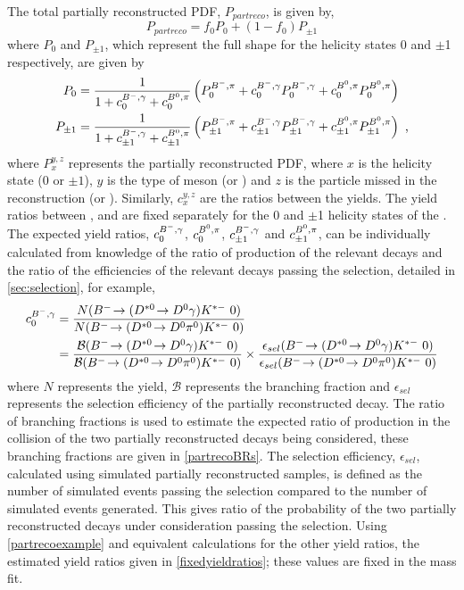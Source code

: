 The total partially reconstructed PDF, $P_{partreco}$, is given by,
\begin{equation}
P_{partreco} = f_0P_0 + (1 - f_0)P_{\pm 1}
\label{partrecofunction}
\end{equation}
where $P_0$ and $P_{\pm 1}$, which represent the full shape for the \Dstar helicity states 0 and $\pm$1 respectively, are given by
\begin{align*}
P_0 &= \frac{1}{1 + c^{{{{B}^-}},\gamma}_0 + c^{{{B}^0},\pi}_0} \left( P^{{{{B}^-}},\pi}_0 + c^{{{{B}^-}},\gamma}_0P^{{{{B}^-}},\gamma}_0 + c^{{{B}^0},\pi}_0P^{{{B}^0},\pi}_0 \right) \\
P_{\pm 1} &= \frac{1}{1 + c^{{{{B}^-}},\gamma}_{\pm 1} + c^{{{B}^0},\pi}_{\pm 1}} \left( P^{{{{B}^-}},\pi}_{\pm 1} + c^{{{{B}^-}},\gamma}_{\pm 1}P^{{{{B}^-}},\gamma}_{\pm 1} + c^{{{B}^0},\pi}_{\pm 1}P^{{{B}^0},\pi}_{\pm 1} \right) \text{ ,}
\end{align*}
where $P_x^{y,z}$ represents the partially reconstructed PDF, where $x$ is the \Dstar helicity state ($0$ or $\pm 1$), $y$ is the type of \B meson (\Bm or \Bd) and $z$ is the particle missed in the reconstruction (\pion or \Pgamma). Similarly, $c_x^{y,z}$ are the ratios between the yields. The yield ratios between \decay{\Bm}{(\decay{\Dstarz}{\Dz[\piz]})\Kstarm}, \decay{\Bm}{(\decay{\Dstarz}{\Dz[\gamma]})\Kstarm} and \decay{\Bd}{(\decay{\Dstarp}{\Dz[\pip]})\Kstarm} are fixed separately for the 0 and $\pm$1 helicity states of the \Dstar. The expected yield ratios, $c^{{{{B}^-}},\gamma}_0$, $c^{{{B}^0},\pi}_0$, $c^{{{{B}^-}},\gamma}_{\pm 1}$ and $c^{{{B}^0},\pi}_{\pm 1}$, can be individually calculated from knowledge of the ratio of production of the relevant decays and the ratio of the efficiencies of the relevant decays passing the selection, detailed in \sect\ref{sec:selection}, for example, 
\begin{align}
c^{\Bm,\gamma}_0 &= \frac{N(\decay{\Bm}{(\decay{\Dstarz}{\Dz\gamma})\Kstarm}\ 0)}{N(\decay{\Bm}{(\decay{\Dstarz}{\Dz\piz})\Kstarm}\ 0)} \nonumber \\ 
&= \frac{\mathcal{B}(\decay{\Bm}{(\decay{\Dstarz}{\Dz\gamma})\Kstarm}\ 0)}{\mathcal{B}(\decay{\Bm}{(\decay{\Dstarz}{\Dz\piz})\Kstarm}\ 0)} \times \frac{\epsilon_{sel}(\decay{\Bm}{(\decay{\Dstarz}{\Dz\gamma})\Kstarm}\ 0)}{\epsilon_{sel}(\decay{\Bm}{(\decay{\Dstarz}{\Dz\piz})\Kstarm}\ 0)}
\label{partrecoexample}
\end{align}
where $N$ represents the yield, $\mathcal{B}$ represents the branching fraction and $\epsilon_{sel}$ represents the selection efficiency of the partially reconstructed decay. The ratio of branching fractions is used to estimate the expected ratio of production in the collision of the two partially reconstructed decays being considered, these branching fractions are given in \tab\ref{partrecoBRs}. The selection efficiency, $\epsilon_{sel}$, calculated using simulated partially reconstructed samples, is defined as the number of simulated events passing the selection compared to the number of simulated events generated. This gives ratio of the probability of the two partially reconstructed decays under consideration passing the selection. Using \eqn\ref{partrecoexample} and equivalent calculations for the other yield ratios, the estimated yield ratios given in \tab\ref{fixedyieldratios}; these values are fixed in the mass fit. 

